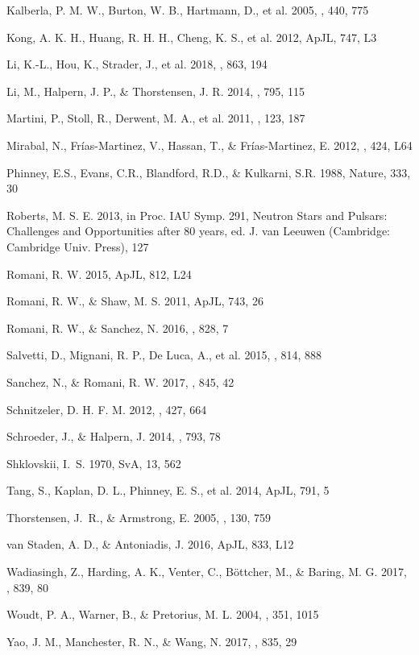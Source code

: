 \documentclass[iop]{emulateapj}
\begin{document}
\begin{thebibliography}
Kalberla, P. M. W., Burton, W. B., Hartmann, D., et al. 2005, \aap, 440, 775

Kong, A. K. H., Huang, R. H. H., Cheng, K. S., et al. 2012, ApJL, 747, L3 

Li, K.-L., Hou, K., Strader, J., et al. 2018, \apj, 863, 194

Li, M., Halpern, J. P., \& Thorstensen, J. R. 2014, \apj, 795, 115

Martini, P., Stoll, R., Derwent, M. A., et al. 2011, \pasp, 123, 187

Mirabal, N., Frías-Martinez, V., Hassan, T., \& Frías-Martinez, E. 2012,
\mnras, 424, L64

Phinney, E.S., Evans, C.R., Blandford, R.D., \& Kulkarni, S.R. 1988, Nature, 333, 30
  
Roberts, M. S. E. 2013, in Proc. IAU Symp. 291,
Neutron Stars and Pulsars: Challenges and Opportunities after 80 years,
ed. J. van Leeuwen (Cambridge: Cambridge Univ. Press), 127

Romani, R. W. 2015, ApJL, 812, L24

Romani, R. W., \& Shaw, M. S. 2011, ApJL, 743, 26

Romani, R. W., \& Sanchez, N. 2016, \apj, 828, 7

Salvetti, D., Mignani, R. P., De Luca, A., et al. 2015, \apj, 814, 888

Sanchez, N., \& Romani, R. W. 2017, \apj, 845, 42

Schnitzeler, D. H. F. M. 2012, \mnras, 427, 664

Schroeder, J., \& Halpern, J. 2014, \apj, 793, 78

Shklovskii, I.~S. 1970, SvA, 13, 562

Tang, S., Kaplan, D. L., Phinney, E. S., et al. 2014, ApJL, 791, 5

Thorstensen, J.~R., \& Armstrong, E. 2005, \apj, 130, 759

van Staden, A. D., \& Antoniadis, J. 2016, ApJL, 833, L12

Wadiasingh, Z., Harding, A. K., Venter, C., B\"ottcher, M., \& Baring, M. G.
2017, \apj, 839, 80

Woudt, P. A., Warner, B., \& Pretorius, M. L. 2004, \mnras, 351, 1015

Yao, J. M., Manchester, R. N., \& Wang, N. 2017, \mnras, 835, 29

\end{thebibliography}
\end{document}
